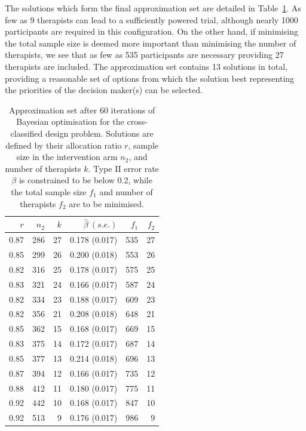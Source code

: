 \documentclass{article} %
\begin{document}
The solutions which form the final approximation set are detailed in Table~\ref{tab:CC_single_run}. As few as 9 therapists can lead to a sufficiently powered trial, although nearly 1000 participants are required in this configuration. On the other hand, if minimising the total sample size is deemed more important than minimising the number of therapists, we see that as few as 535 participants are necessary providing 27 therapists are included. The approximation set contains 13 solutions in total, providing a reasonable set of options from which the solution best representing the priorities of the decision maker(s) can be selected.

\begin{table}
\centering
\begin{tabular}{rrrrrr}
\toprule
$r$ & $n_{2}$ & $k$ & $\hat{\beta}~(s.e.)$ & $f_{1}$ & $f_{2}$ \\ 
\midrule
0.87 & 286 & 27 & 0.178 (0.017) & 535 & 27 \\ 
0.85 & 299 & 26 & 0.200 (0.018) & 553 & 26 \\ 
0.82 & 316 & 25 & 0.178 (0.017) & 575 & 25 \\ 
0.83 & 321 & 24 & 0.166 (0.017) & 587 & 24 \\ 
0.82 & 334 & 23 & 0.188 (0.017) & 609 & 23 \\ 
0.82 & 356 & 21 & 0.208 (0.018) & 648 & 21 \\ 
0.85 & 362 & 15 & 0.168 (0.017) & 669 & 15 \\ 
0.83 & 375 & 14 & 0.172 (0.017) & 687 & 14 \\ 
0.85 & 377 & 13 & 0.214 (0.018) & 696 & 13 \\ 
0.87 & 394 & 12 & 0.166 (0.017) & 735 & 12 \\ 
0.88 & 412 & 11 & 0.180 (0.017) & 775 & 11 \\ 
0.92 & 442 & 10 & 0.168 (0.017) & 847 & 10 \\ 
0.92 & 513 & 9 & 0.176 (0.017) & 986 & 9 \\ 
\bottomrule
\end{tabular}
\caption{Approximation set after 60 iterations of Bayesian optimisation for the cross-classified design problem. Solutions are defined by their allocation ratio $r$, sample size in the intervention arm $n_{2}$, and number of therapists $k$. Type II error rate $\beta$ is constrained to be below 0.2, while the total sample size $f_{1}$ and number of therapists $f_{2}$ are to be minimised.}
\label{tab:CC_single_run}
\end{table}
\end{document}
